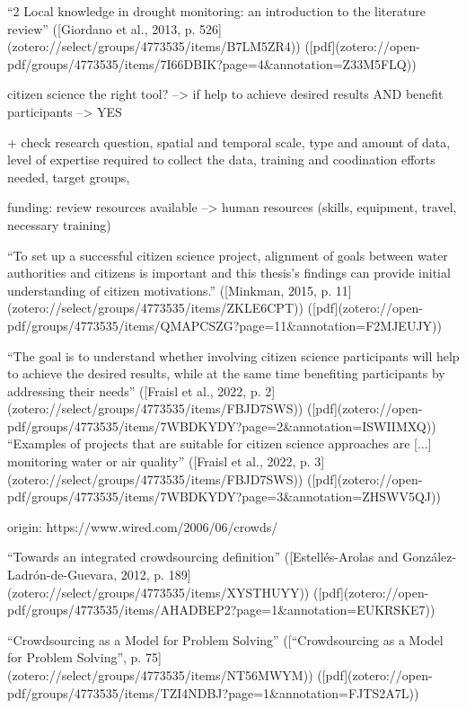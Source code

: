 {“2 Local knowledge in drought monitoring: an introduction to the literature review” ([Giordano et al., 2013, p. 526](zotero://select/groups/4773535/items/B7LM5ZR4)) ([pdf](zotero://open-pdf/groups/4773535/items/7I66DBIK?page=4&annotation=Z33M5FLQ))

citizen science the right tool?
--> if help to achieve desired results AND benefit participants --> YES

+ check research question, spatial and temporal scale, type and amount of data, level of expertise required to collect the data, training and coodination efforts needed, target groups, 

funding: review resources available --> human resources (skills, equipment, travel, necessary training)

“To set up a successful citizen science project, alignment of goals between water authorities and citizens is important and this thesis’s findings can provide initial understanding of citizen motivations.” ([Minkman, 2015, p. 11](zotero://select/groups/4773535/items/ZKLE6CPT)) ([pdf](zotero://open-pdf/groups/4773535/items/QMAPCSZG?page=11&annotation=F2MJEUJY))
% 

“The goal is to understand whether involving citizen science participants will help to achieve the desired results, while at the same time benefiting participants by addressing their needs” ([Fraisl et al., 2022, p. 2](zotero://select/groups/4773535/items/FBJD7SWS)) ([pdf](zotero://open-pdf/groups/4773535/items/7WBDKYDY?page=2&annotation=ISWIIMXQ))
“Examples of projects that are suitable for citizen science approaches are [...] monitoring water or air quality” ([Fraisl et al., 2022, p. 3](zotero://select/groups/4773535/items/FBJD7SWS)) ([pdf](zotero://open-pdf/groups/4773535/items/7WBDKYDY?page=3&annotation=ZHSWV5QJ))

origin: https://www.wired.com/2006/06/crowds/

“Towards an integrated crowdsourcing definition” ([Estellés-Arolas and González-Ladrón-de-Guevara, 2012, p. 189](zotero://select/groups/4773535/items/XYSTHUYY)) ([pdf](zotero://open-pdf/groups/4773535/items/AHADBEP2?page=1&annotation=EUKRSKE7))

“Crowdsourcing as a Model for Problem Solving” ([“Crowdsourcing as a Model for Problem Solving”, p. 75](zotero://select/groups/4773535/items/NT56MWYM)) ([pdf](zotero://open-pdf/groups/4773535/items/TZI4NDBJ?page=1&annotation=FJTS2A7L))


}
